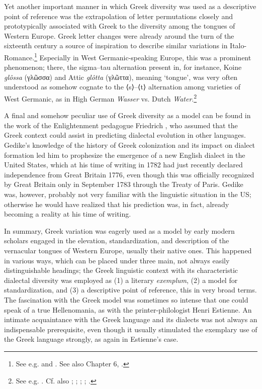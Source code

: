 Yet another important manner in which Greek diversity was used as a descriptive point of reference was the extrapolation of letter permutations closely and prototypically associated with Greek to the diversity among the tongues of Western Europe. Greek letter changes were already around the turn of the sixteenth century a source of inspiration to describe similar variations in Italo-Romance.\footnote{See e.g. \citet[*.ii\textsc{\textsuperscript{v}}]{Manutius1496Aldus} and . See also Chapter 6, .} Especially in West Germanic-speaking Europe, this was a prominent phenomenon; there, the sigma–tau alternation present in, for instance, Koine \textit{glôssa} (γλῶσσα) and Attic \textit{glôtta} (γλῶττα), meaning ‘tongue’, was very often understood as somehow cognate to the ⟨s⟩–⟨t⟩ alternation among varieties of West Germanic, as in High German \textit{Wasser} vs. Dutch \textit{Water}.\footnote{See e.g. \citet[21]{Mylius1612}. Cf. also \citet[\textsc{m}.ii\textsc{\textsuperscript{r}}]{Althamer1536}; \citet[\textsc{a.3}\textsc{\textsuperscript{r}}]{Chytraeus1582}; \citet[119--132]{Reitz1730}; \citet[61--62]{Ruhig1745}; \citet[23--24]{Hof1772}.}

A final and somehow peculiar use of Greek diversity as a model can be found in the work of the Enlightenment pedagogue Friedrich \citet[7]{Gedike1782}, who assumed that the Greek context could assist in predicting dialectal evolution in other languages. Gedike’s knowledge of the history of Greek colonization and its impact on dialect formation led him to prophesize the emergence of a new English dialect in the United States, which at his time of writing in 1782 had just recently declared independence from Great Britain 1776, even though this was officially recognized by Great Britain only in September 1783 through the Treaty of Paris. Gedike was, however, probably not very familiar with the linguistic situation in the US; otherwise he would have realized that his prediction was, in fact, already becoming a reality at his time of writing.

In summary, Greek variation was eagerly used as a model by early modern scholars engaged in the elevation, standardization, and description of the vernacular tongues of Western Europe, usually their native ones. This happened in various ways, which can be placed under three main, not always easily distinguishable headings; the Greek linguistic context with its characteristic dialectal diversity was employed as (1) a literary \textit{exemplum}, (2) a model for standardization, and (3) a descriptive point of reference, this in very broad terms. The fascination with the Greek model was sometimes so intense that one could speak of a true Hellenomania, as with the printer-philologist Henri Estienne. An intimate acquaintance with the Greek language and its dialects was not always an indispensable prerequisite, even though it usually stimulated the exemplary use of the Greek language strongly, as again in Estienne’s case.

